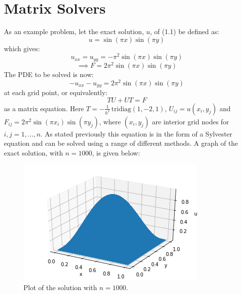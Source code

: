 \documentclass{article}
\numberwithin{equation}{section}
\begin{document}
\section{Matrix Solvers}
As an example problem, let the exact solution, $u$, of (1.1) be defined as:
\begin{equation} 
u = \sin{(\pi x)} \sin{(\pi y)}
\end{equation}
which gives:
\begin{equation} 
u_{xx} = u_{yy} = - \pi^2 \sin{(\pi x)} \sin{(\pi y)}
\end{equation}
\begin{equation}
\implies F = 2 \pi^2 \sin{(\pi x)} \sin {(\pi y)}
\end{equation}
The PDE to be solved is now:
\begin{equation}
-u_{xx} - u_{yy}  = 2 \pi^2 \sin{(\pi x)} \sin {(\pi y)}
\end{equation}
at each grid point, or equivalently:
	\begin{equation}
	TU + UT = F
	\end{equation}
as a matrix equation. Here $T=-\frac{1}{h^2} \, \text{tridiag}(1,-2,1)$, $U_{ij} = u(x_i, y_j)$ and $F_{ij} = 2 \pi^2 \sin{(\pi x_i)} \sin{(\pi y_j)}$, where $(x_i, y_j)$ are interior grid nodes for $i,j=1,\dots,n$. As stated previously this equation is in the form of a Sylvester equation and can be solved using a range of different methods. A graph of the exact solution, with $n=1000$, is given below:

\begin{figure}[H]
\includegraphics[scale=.7]{img/solution.png}
\centering
\caption{Plot of the solution with $n=1000$.}
\end{figure} 
\end{document}
